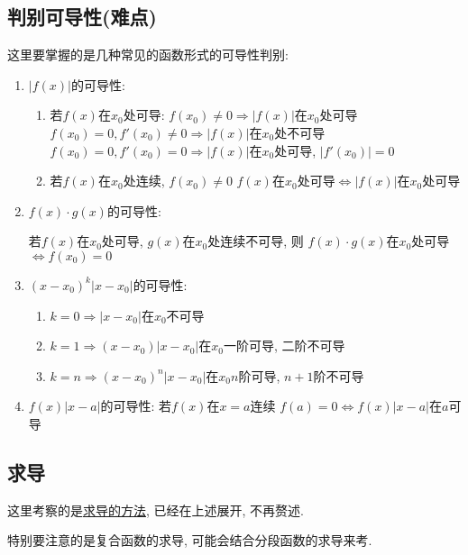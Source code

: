 \subsection{判别可导性(难点)}
这里要掌握的是几种常见的函数形式的可导性判别:
\begin{enumerate}
    \item $ |f(x)| $的可导性:
          \begin{enumerate}
              \item 若$ f(x) $在$ x_{0} $处可导:
                    \subitem $ f(x_{0})\neq 0 \Rightarrow |f(x)| $在$ x_{0} $处可导
                    \subitem $ f(x_{0})=0, f'(x_{0})\neq 0 \Rightarrow |f(x)| $在$ x_{0} $处不可导
                    \subitem $ f(x_{0})=0, f'(x_{0})=0 \Rightarrow |f(x)| $在$ x_{0} $处可导, $ |f'(x_{0})|=0 $
              \item 若$ f(x) $在$ x_{0} $处连续, $ f(x_{0})\neq 0 $
                    \subitem $ f(x) $在$ x_{0} $处可导$ \Leftrightarrow |f(x)| $在$ x_{0} $处可导
          \end{enumerate}
    \item $ f(x)\cdot g(x) $的可导性: \par 若$ f(x) $在$ x_{0} $处可导, $ g(x) $在$ x_{0} $处连续不可导, 则
          \subitem $ f(x)\cdot g(x) $在$ x_{0} $处可导$ \Leftrightarrow f(x_{0})=0 $
    \item $ (x-x_{0})^{k}|x-x_{0}| $的可导性:
          \begin{enumerate}
              \item $ k=0 \Rightarrow |x-x_{0}| $在$ x_{0} $不可导
              \item $ k=1 \Rightarrow (x-x_{0})|x-x_{0}| $在$ x_{0} $一阶可导, 二阶不可导
              \item $ k=n \Rightarrow (x-x_{0})^{n}|x-x_{0}| $在$ x_{0} $$ n $阶可导, $ n+1 $阶不可导
          \end{enumerate}
    \item $ f(x)|x-a| $的可导性: 若$ f(x) $在$ x=a $连续
          \subitem $ f(a)=0\Leftrightarrow f(x)|x-a| $在$ a $可导
\end{enumerate}
\subsection{求导}
这里考察的是\hyperref[求导的方法]{求导的方法}, 已经在上述展开, 不再赘述.\par
特别要注意的是复合函数的求导, 可能会结合分段函数的求导来考.
